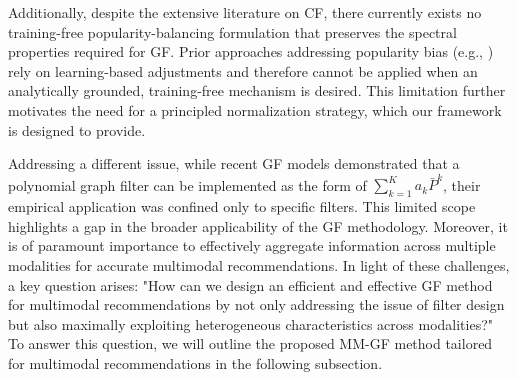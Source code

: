 \documentclass[a4paper,fleqn]{cas-sc}
\renewcommand{\cite}{\citep}
\begin{document}
Additionally, despite the extensive literature on CF, there currently exists no training-free popularity-balancing formulation that preserves the spectral properties required for GF. Prior approaches addressing popularity bias (e.g., \cite{DBLP:conf/sigir/0002YKL25, DBLP:journals/tors/PengSLM25}) rely on learning-based adjustments and therefore cannot be applied when an analytically grounded, training-free mechanism is desired. This limitation further motivates the need for a principled normalization strategy, which our framework is designed to provide.

Addressing a different issue, while recent GF models \cite{DBLP:conf/sigir/ParkSS24,DBLP:conf/www/ParkYS25, DBLP:conf/www/KimCPS25} demonstrated that a polynomial graph filter can be implemented as the form of $\sum_{k=1}^K a_k \bar{P}^k$, their empirical application was confined only to specific filters. This limited scope highlights a gap in the broader applicability of the GF methodology. Moreover, it is of paramount importance to effectively aggregate information across multiple modalities for accurate multimodal recommendations. In light of these challenges, a key question arises: "How can we design an efficient and effective GF method for multimodal recommendations by not only addressing the issue of filter design but also maximally exploiting heterogeneous characteristics across modalities?" To answer this question, we will outline the proposed \textsf{MM-GF} method tailored for multimodal recommendations in the following subsection.

\end{document}
